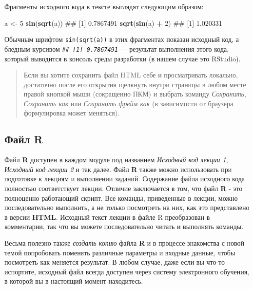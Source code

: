 \documentclass[]{book}
\newenvironment{Shaded}{\begin{snugshade}}{\end{snugshade}}
\newcommand{\KeywordTok}[1]{\textcolor[rgb]{0.13,0.29,0.53}{\textbf{#1}}}
\newcommand{\DecValTok}[1]{\textcolor[rgb]{0.00,0.00,0.81}{#1}}
\newcommand{\StringTok}[1]{\textcolor[rgb]{0.31,0.60,0.02}{#1}}
\newcommand{\OperatorTok}[1]{\textcolor[rgb]{0.81,0.36,0.00}{\textbf{#1}}}
\newcommand{\NormalTok}[1]{#1}
\begin{document}
Фрагменты исходного кода в тексте выглядят следующим образом:

\begin{Shaded}
\begin{Highlighting}[]
\NormalTok{a <-}\StringTok{ }\DecValTok{5}
\KeywordTok{sin}\NormalTok{(}\KeywordTok{sqrt}\NormalTok{(a))}
\NormalTok{## [1] 0.7867491}
\KeywordTok{sqrt}\NormalTok{(}\KeywordTok{sin}\NormalTok{(a) }\OperatorTok{+}\StringTok{ }\DecValTok{2}\NormalTok{)}
\NormalTok{## [1] 1.020331}
\end{Highlighting}
\end{Shaded}

Обычным шрифтом \texttt{sin(sqrt(a))} в этих фрагментах показан исходный
код, а бледным курсивом \emph{\texttt{\#\#\ {[}1{]}\ 0.7867491}} ---
результат выполнения этого кода, который выводится в консоль среды
разработки (в нашем случае это RStudio).

\begin{quote}
Если вы хотите сохранить файл HTML себе и просматривать локально,
достаточно после его открытия щелкнуть внутри страницы в любом месте
правой кнопкой мыши (сокращенно ПКМ) и выбрать команду \emph{Сохранить},
\emph{Сохранить как} или \emph{Сохранить фрейм как} (в зависимости от
браузера формулировка может меняться).
\end{quote}

\subsection*{Файл R}\label{-r}

Файл \textbf{R} доступен в каждом модуле под названием \emph{Исходный
код лекции 1}, \emph{Исходный код лекции 2} и так далее. Файл \textbf{R}
также можно использовать при подготовке к лекциям и выполнении заданий.
Содержание файла исходного кода полностью соответствует лекции. Отличие
заключается в том, что файл \textbf{R} - это полноценно работающий
скрипт. Все команды, приведенные в лекции, можно последовательно
выполнить, а не только посмотреть на них, как это представлено в версии
\textbf{HTML}. Исходный текст лекции в файле R преобразован в
комментарии, так что вы можете последовательно читать и выполнять
команды.

Весьма полезно также \emph{создать копию} файла \textbf{R} и в процессе
знакомства с новой темой попробовать поменять различные параметры и
входные данные, чтобы посмотреть как меняется результат. В любом случае,
даже если вы что-то испортите, исходный файл всегда доступен через
систему электронного обучения, в которой вы в настоящий момент
находитесь.
\end{document}
